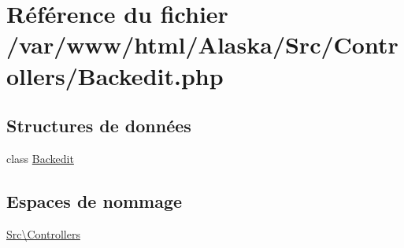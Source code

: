 \hypertarget{_backedit_8php}{}\section{Référence du fichier /var/www/html/\+Alaska/\+Src/\+Controllers/\+Backedit.php}
\label{_backedit_8php}
\subsection*{Structures de données}
\begin{DoxyCompactItemize}
\item 
class \hyperlink{class_src_1_1_controllers_1_1_backedit}{Backedit}
\end{DoxyCompactItemize}
\subsection*{Espaces de nommage}
\begin{DoxyCompactItemize}
\item 
 \hyperlink{namespace_src_1_1_controllers}{Src\textbackslash{}\+Controllers}
\end{DoxyCompactItemize}
